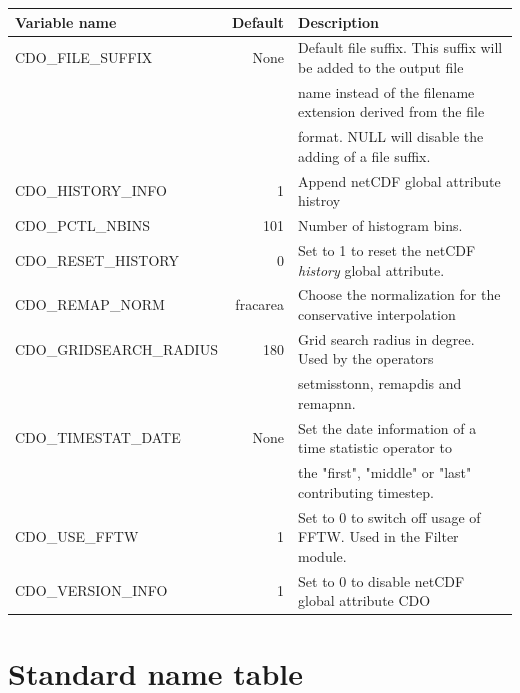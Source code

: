 \begin{tabular}[t]{|>{\columncolor{pcolor1}}l|r|l|}
\hline
\rowcolor{pcolor2}
{\bf Variable name}           &  {\bf Default} & {\bf Description} \\ \hline
CDO\_FILE\_SUFFIX             &   None   &  Default file suffix. This suffix will be added to the output file \\
                                           &               &  name instead of the filename extension derived from the file \\
                                           &               & format. NULL will disable the adding of a file suffix. \\ \hline
CDO\_HISTORY\_INFO        &         1   & Append netCDF global attribute histroy \\ \hline
CDO\_PCTL\_NBINS            &     101    & Number of histogram bins. \\ \hline
CDO\_RESET\_HISTORY       &         0  & Set to 1 to reset the netCDF {\it history} global attribute.\\ \hline
CDO\_REMAP\_NORM         &  fracarea & Choose the normalization for the conservative interpolation \\
CDO\_GRIDSEARCH\_RADIUS       &  180       & Grid search radius in degree. Used by the operators \\
                                                     &        & setmisstonn, 
                                                                remapdis and remapnn. \\ \hline
CDO\_TIMESTAT\_DATE     &  None   & Set the date information of a time statistic operator to \\
                                           &             &  the "first", "middle" or "last" contributing timestep.\\ \hline
CDO\_USE\_FFTW               &         1  & Set to 0 to switch off usage of FFTW. Used in the Filter module.\\ \hline
CDO\_VERSION\_INFO        &         1  & Set to 0 to disable netCDF global attribute CDO \\ \hline
\end{tabular}





\chapter{\label{stdnametable}Standard name table}

